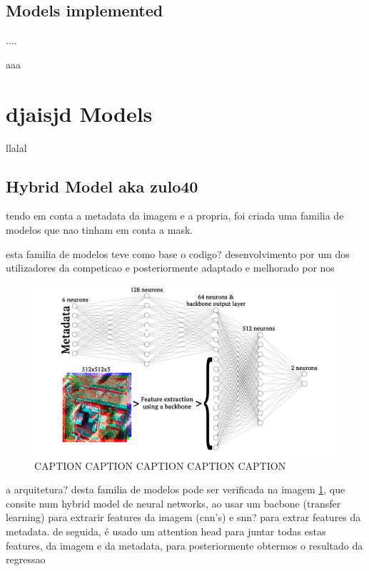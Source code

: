\documentclass[conference]{IEEEtran}
\begin{document}
\subsection{Models implemented}

....




aaa


\section{djaisjd Models}

llalal


\subsection{Hybrid Model aka zulo40}

tendo em conta a metadata da imagem e a propria, foi criada uma familia de modelos que nao tinham em conta a mask.

esta familia de modelos teve como base o codigo? desenvolvimento por um dos utilizadores da competicao e posteriormente adaptado e melhorado por nos

\begin{figure}[H]
    \centering
    \includegraphics[width=1\linewidth]{assets/nn.png}
    \caption{CAPTION CAPTION CAPTION CAPTION CAPTION}
    \label{fig:nn}
\end{figure}

a arquitetura? desta familia de modelos pode ser verificada na imagem \ref{fig:nn}, que consite num hybrid model de neural networks, ao usar um bacbone (transfer learning) para extrarir features da imagem (cnn's) e snn? para extrar features da metadata. de seguida, é usado um attention head para juntar todas estas features, da imagem e da metadata, para posteriormente obtermos o resultado da regressao
\end{document}
